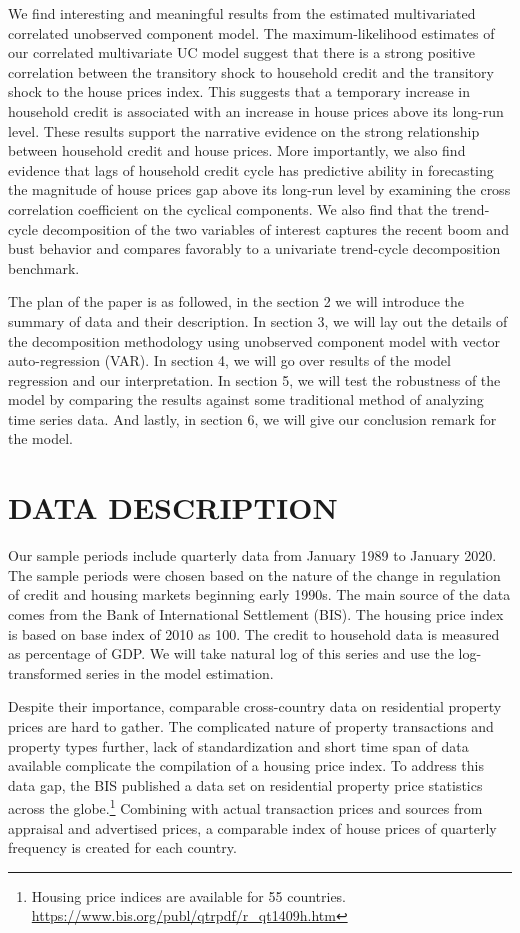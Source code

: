 \documentclass[
  12pt,
]{article}
\begin{document}
We find interesting and meaningful results from the estimated multivariated correlated unobserved component model. The maximum-likelihood estimates of our correlated multivariate UC model suggest that there is a strong positive correlation between the transitory shock to household credit and the transitory shock to the house prices index. This suggests that a temporary increase in household credit is associated with an increase in house prices above its long-run level. These results support the narrative evidence on the strong relationship between household credit and house prices. More importantly, we also find evidence that lags of household credit cycle has predictive ability in forecasting the magnitude of house prices gap above its long-run level by examining the cross correlation coefficient on the cyclical components. We also find that the trend-cycle decomposition of the two variables of interest captures the recent boom and bust behavior and compares favorably to a univariate trend-cycle decomposition benchmark.

The plan of the paper is as followed, in the section 2 we will introduce the summary of data and their description. In section 3, we will lay out the details of the decomposition methodology using unobserved component model with vector auto-regression (VAR). In section 4, we will go over results of the model regression and our interpretation. In section 5, we will test the robustness of the model by comparing the results against some traditional method of analyzing time series data. And lastly, in section 6, we will give our conclusion remark for the model.

\hypertarget{data-description}{%
\section{DATA DESCRIPTION}\label{data-description}}

Our sample periods include quarterly data from January 1989 to January 2020. The sample periods were chosen based on the nature of the change in regulation of credit and housing markets beginning early 1990s. The main source of the data comes from the Bank of International Settlement (BIS). The housing price index is based on base index of 2010 as 100. The credit to household data is measured as percentage of GDP. We will take natural log of this series and use the log-transformed series in the model estimation.

Despite their importance, comparable cross-country data on residential property prices are hard to gather. The complicated nature of property transactions and property types further, lack of standardization and short time span of data available complicate the compilation of a housing price index. To address this data gap, the BIS published a data set on residential property price statistics across the globe.\footnote{Housing price indices are available for 55 countries. \url{https://www.bis.org/publ/qtrpdf/r_qt1409h.htm}} Combining with actual transaction prices and sources from appraisal and advertised prices, a comparable index of house prices of quarterly frequency is created for each country.
\end{document}
